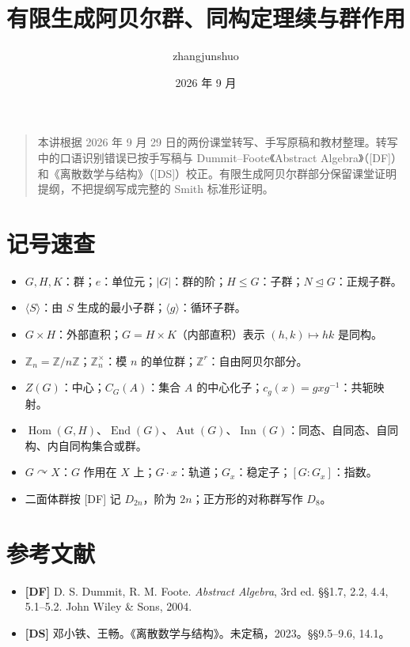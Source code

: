 \documentclass[UTF8,a4paper,11pt]{ctexart}
\title{有限生成阿贝尔群、同构定理续与群作用}
\author{zhangjunshuo}\date{2026 年 9 月}
\begin{document}
\maketitle
\begin{quote}
本讲根据 2026 年 9 月 29 日的两份课堂转写、手写原稿和教材整理。转写中的口语识别错误已按手写稿与 Dummit--Foote《Abstract Algebra》（[DF]）和《离散数学与结构》（[DS]）校正。有限生成阿贝尔群部分保留课堂证明提纲，不把提纲写成完整的 Smith 标准形证明。
\end{quote}
\tableofcontents\clearpage

\section*{记号速查}
\begin{itemize}
\item $G,H,K$：群；$e$：单位元；$|G|$：群的阶；$H\le G$：子群；$N\trianglelefteq G$：正规子群。
\item $\langle S\rangle$：由 $S$ 生成的最小子群；$\langle g\rangle$：循环子群。
\item $G\times H$：外部直积；$G=H\times K$（内部直积）表示 $(h,k)\mapsto hk$ 是同构。
\item $\mathbb Z_n=\mathbb Z/n\mathbb Z$；$\mathbb Z_n^\times$：模 $n$ 的单位群；$\mathbb Z^r$：自由阿贝尔部分。
\item $Z(G)$：中心；$C_G(A)$：集合 $A$ 的中心化子；$c_g(x)=gxg^{-1}$：共轭映射。
\item $\operatorname{Hom}(G,H)$、$\operatorname{End}(G)$、$\operatorname{Aut}(G)$、$\operatorname{Inn}(G)$：同态、自同态、自同构、内自同构集合或群。
\item $G\curvearrowright X$：$G$ 作用在 $X$ 上；$G\cdot x$：轨道；$G_x$：稳定子；$[G:G_x]$：指数。
\item 二面体群按 [DF] 记 $D_{2n}$，阶为 $2n$；正方形的对称群写作 $D_8$。
\end{itemize}
\clearpage







\section*{参考文献}
\begin{itemize}
\item \textbf{[DF]} D. S. Dummit, R. M. Foote. \emph{Abstract Algebra}, 3rd ed. §§1.7, 2.2, 4.4, 5.1--5.2. John Wiley \& Sons, 2004.
\item \textbf{[DS]} 邓小铁、王畅。《离散数学与结构》。未定稿，2023。§§9.5--9.6, 14.1。
\end{itemize}
\end{document}
